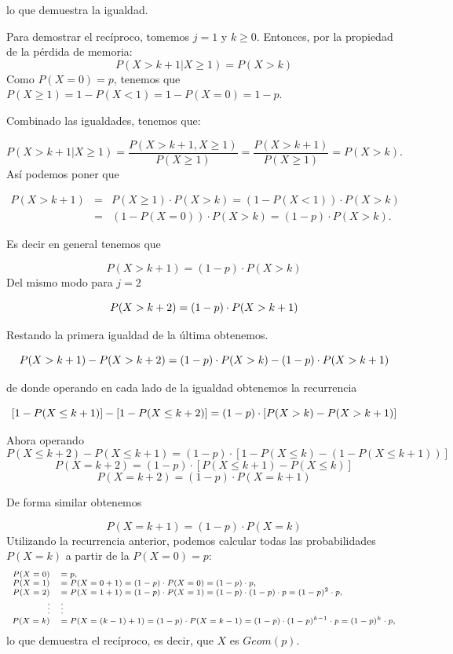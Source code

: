 \documentclass[
  letterpaper,
  DIV=11,
  numbers=noendperiod]{scrreprt}
\begin{document}
lo que demuestra la igualdad.

Para demostrar el recíproco, tomemos \(j=1\) y \(k\geq 0\). Entonces,
por la propiedad de la pérdida de memoria: \[
P\left(X> k+1\big| X\geq 1\right)=P(X> k)
\] Como \(P(X=0)=p\), tenemos que
\(P(X \geq 1 )=1-P(X<1)=1-P(X=0)=1-p\).

Combinado las igualdades, tenemos que:

\[
P\left(X> k+1\big| X\geq 1\right)=\frac{P(X>k+1, X\geq 1)}{P(X\geq 1)}=\frac{P(X>k+1)}{P(X\geq 1)}=P(X>k).
\] Así podemos poner que

\begin{eqnarray*}
P(X>k+1)&=&P(X\geq 1)\cdot P(X>k)=\left(1-P(X<1)\right)\cdot P(X>k)\\
&=&\left(1-P(X=0)\right)\cdot P(X>k)=(1-p)\cdot P(X>k).
\end{eqnarray*}

Es decir en general tenemos que

\[
P(X>k+1)=(1-p)\cdot P(X>k)
\] Del mismo modo para \(j=2\)

\[
\scriptsize{P(X>k+2)=(1-p)\cdot P(X>k+1)}
\]

Restando la primera igualdad de la última obtenemos.

\[
\scriptsize{P(X>k+1)-P(X>k+2)=(1-p)\cdot P(X>k)-(1-p)\cdot P(X>k+1)}
\]

de donde operando en cada lado de la igualdad obtenemos la recurrencia

\[
\scriptsize{[1-P(X\leq k+1)]-[1-P(X\leq k+2)]=(1-p)\cdot [P(X>k)-P(X>k+1)]}
\]

Ahora operando \[
P(X\leq k+2)-P(X\leq k+1)=(1-p)\cdot[1-P(X\leq k)-\left(1-P(X\leq k+1)\right)]
\] \[
P(X=k+2)=(1-p)\cdot[P(X\leq k+1)-P(X\leq k)]
\] \[
P(X=k+2)=(1-p)\cdot P(X=k+1)
\]

De forma similar obtenemos

\[
P(X=k+1)=(1-p)\cdot P(X=k)
\] Utilizando la recurrencia anterior, podemos calcular todas las
probabilidades \(P(X=k)\) a partir de la \(P(X=0)=p\): \[
\scriptsize{
\begin{array}{rl}
P(X=0)&= p,\\
P(X=1)&=P(X=0+1)= (1-p)\cdot P(X=0) =(1-p)\cdot p,\\
P(X=2)&=P(X=1+1)= (1-p)\cdot P(X=1)=(1-p)\cdot (1-p)\cdot p=(1-p)^2\cdot p,\\
 \vdots & \vdots \\
P(X=k)&=P(X=(k-1)+1)= (1-p)\cdot P(X=k-1)=(1-p)\cdot (1-p)^{k-1}\cdot p=(1-p)^{k}\cdot p,
\end{array}
}
\] lo que demuestra el recíproco, es decir, que \(X\) es \(Geom(p)\).
\end{document}
